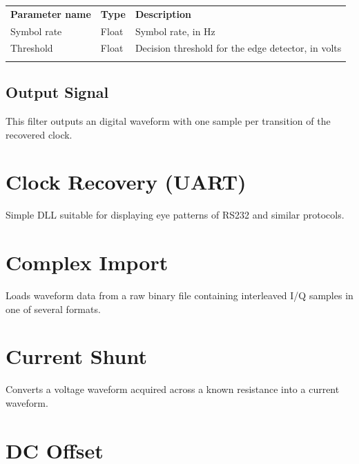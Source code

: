 \begin{tabularx}{16cm}{llX}
\thickhline
\textbf{Parameter name} & \textbf{Type} & \textbf{Description} \\
\thickhline
Symbol rate & Float & Symbol rate, in Hz\\
\thinhline
Threshold & Float & Decision threshold for the edge detector, in volts\\
\thickhline
\end{tabularx}

\subsection{Output Signal}

This filter outputs an digital waveform with one sample per transition of the recovered clock.

\pagebreak
\section{Clock Recovery (UART)}

Simple DLL suitable for displaying eye patterns of RS232 and similar protocols.

\pagebreak
\section{Complex Import}

Loads waveform data from a raw binary file containing interleaved I/Q samples in one of several formats.

\pagebreak
\section{Current Shunt}

Converts a voltage waveform acquired across a known resistance into a current waveform.

\pagebreak
\section{DC Offset}

